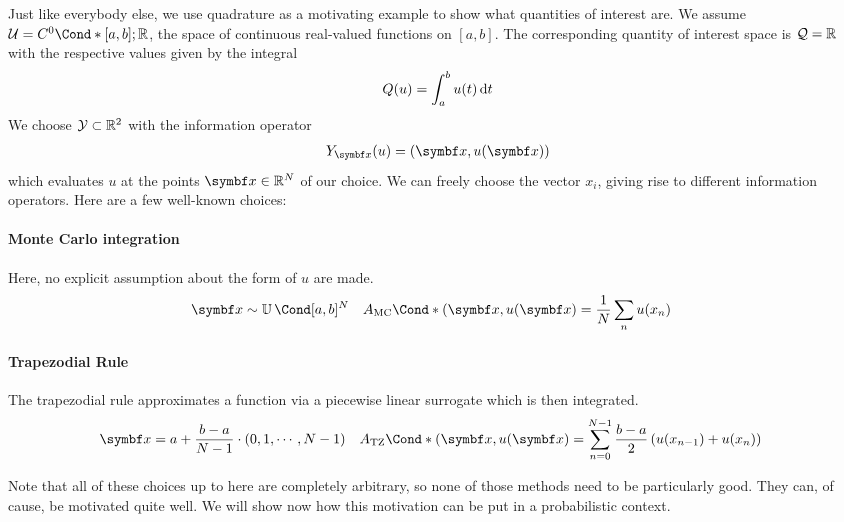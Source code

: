 Just like everybody else, we use quadrature as a motivating example to show what quantities of interest are.
We assume $\Uc = \Fun*{C^0}{[a, b]; \Rb}$, the space of continuous real-valued functions on $[a, b]$.
The corresponding quantity of interest space is $\mathcal{Q} = \mathbb{R}$ with the respective values given by the integral
\begin{align}
    Q(u) = \int_a^b u(t) \mathop{}\!\mathrm{d} t
\end{align}
We choose $\mathcal{Y} \subset \mathbb{R}^2$ with the information operator
\begin{align}
    Y_{\mat{x}}(u) = \left( \mat{x}, u(\mat{x}) \right)
\end{align}
which evaluates $u$ at the points $\mat{x} \in \Rb^N$ of our choice.
We can freely choose the vector $x_i$, giving rise to different information operators.
Here are a few well-known choices:
\paragraph{Monte Carlo integration}
Here, no explicit assumption about the form of $u$ are made.
\begin{align}
    \mat{x}
        &\sim \Uniform{[a, b]^N}
        &\Fun*{A_{\text{MC}}}{(\mat{x}, u(\mat{x})}
        &= \frac{1}{N} \sum_n u(x_n)
\end{align}

\paragraph{Trapezodial Rule}
The trapezodial rule approximates a function via a piecewise linear surrogate which is then integrated.
\begin{align}
    \mat{x}
    &= a + \frac{b - a}{N - 1} \cdot (0, 1, \cdots, N - 1)
    &\Fun*{A_{\text{TZ}}}{(\mat{x}, u(\mat{x})}
    &= \sum_{n=0}^{N - 1} \frac{b - a}{2} \left( u(x_{n-1}) + u(x_n) \right)
\end{align}

Note that all of these choices up to here are completely arbitrary, so none of those methods need to be particularly good.
They can, of cause, be motivated quite well.
We will show now how this motivation can be put in a probabilistic context.


